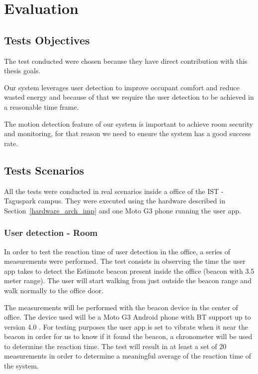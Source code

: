 \chapter{Evaluation}
\label{chapter:evaluation}

\section{Tests Objectives}

The test conducted were chosen because they have direct contribution with this thesis goals.

Our system leverages user detection to improve occupant comfort and reduce wasted energy and because of that we require the user detection to be achieved in a reasonable time frame.

The motion detection feature of our system is important to achieve room security and monitoring, for that reason we need to ensure the system has a good success rate. 


\section{Tests Scenarios}



All the tests were conducted in real scenarios inside a office of the \ac{IST} - Taguspark campus. They
were executed using the hardware described in Section~\ref{hardware_arch_imp} and one Moto G3 phone running the user app.


\subsection{User detection - Room}


In order to test the reaction time of user detection in the office, a series of measurements were performed. The test consists in observing the time the user app takes to detect the Estimote beacon present inside the office (beacon with 3.5 meter range). The user will start walking from just outside the beacon range and walk normally to the office door.

The measurements will be performed with the beacon device in the center of office. The device used will be a Moto G3 Android phone with BT support up to version 4.0 .
For testing purposes the user app is set to vibrate when it near the beacon in order for us to know if it found the beacon, a chronometer will be used to determine the reaction time. The test will result in at least a set of 20 measurements in order to determine a meaningful average of the reaction time of the system.


